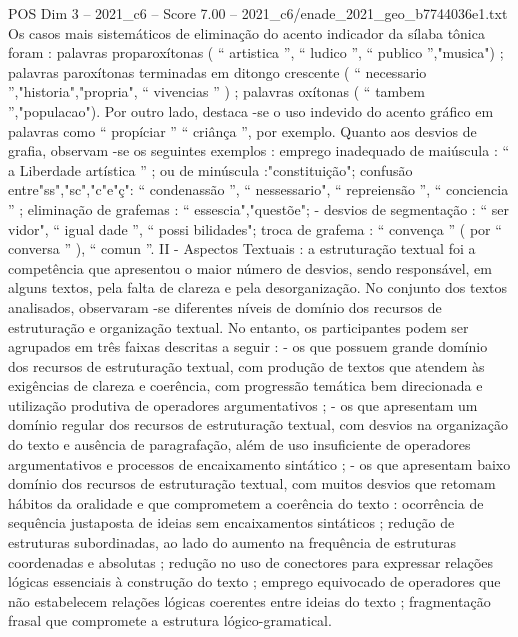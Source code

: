 \begin{textsample}{POS Dim 3 – 2021\_c6 – Score 7.00 – 2021\_c6/enade\_2021\_geo\_b7744036e1.txt}
Os casos mais sistemáticos de eliminação do acento indicador da sílaba tônica foram : palavras proparoxítonas ( “ artistica ”, “ ludico ”, “ publico ”,"musica") ; palavras paroxítonas terminadas em ditongo crescente ( “ necessario ”,"historia","propria", “ vivencias ” ) ; palavras oxítonas ( “ tambem ”,"populacao").
Por outro lado, destaca -se o uso indevido do acento gráfico em palavras como “ propíciar ” “ criânça ”, por exemplo.
Quanto aos desvios de grafia, observam -se os seguintes exemplos : emprego inadequado de maiúscula : “ a Liberdade artística ” ; ou de minúscula :"constituição"; confusão entre"ss","sc","c"e"ç": “ condenassão ”, “ nessessario", “ repreiensão ”, “ conciencia ” ; eliminação de grafemas : “ essescia","questõe"; - desvios de segmentação : “ ser vidor", “ igual dade ”, “ possi bilidades"; troca de grafema : “ convença ” ( por “ conversa ” ), “ comun ”.
II - Aspectos Textuais : a estruturação textual foi a competência que apresentou o maior número de desvios, sendo responsável, em alguns textos, pela falta de clareza e pela desorganização.
No conjunto dos textos analisados, observaram -se diferentes níveis de domínio dos recursos de estruturação e organização textual.
No entanto, os participantes podem ser agrupados em três faixas descritas a seguir : - os que possuem grande domínio dos recursos de estruturação textual, com produção de textos que atendem às exigências de clareza e coerência, com progressão temática bem direcionada e utilização produtiva de operadores argumentativos ; - os que apresentam um domínio regular dos recursos de estruturação textual, com desvios na organização do texto e ausência de paragrafação, além de uso insuficiente de operadores argumentativos e processos de encaixamento sintático ; - os que apresentam baixo domínio dos recursos de estruturação textual, com muitos desvios que retomam hábitos da oralidade e que comprometem a coerência do texto : ocorrência de sequência justaposta de ideias sem encaixamentos sintáticos ; redução de estruturas subordinadas, ao lado do aumento na frequência de estruturas coordenadas e absolutas ; redução no uso de conectores para expressar relações lógicas essenciais à construção do texto ; emprego equivocado de operadores que não estabelecem relações lógicas coerentes entre ideias do texto ; fragmentação frasal que compromete a estrutura lógico-gramatical.

\end{textsample}
